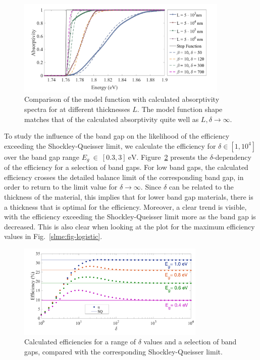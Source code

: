 \begin{refsection}
\begin{figure}[ht] 
\centering 
\captionsetup{width=0.9\textwidth}
\includegraphics[width=0.9\textwidth]{Figures/slme/sq_Fig2.png} 
\caption{Comparison of the model function with calculated absorptivity spectra 
for  at different thicknesses $L$. The model function shape 
matches that of the calculated absorptivity quite well as $L,\delta 
\rightarrow \infty$.} 
\label{slme:fig-step} 
\end{figure} 
 
To study the influence of the band gap on the likelihood of the efficiency 
exceeding the Shockley-Queisser limit, we calculate the efficiency for $\delta 
\in [1, 10^4]$ over the band gap range $E_g~\in~[0.3, 3]~\si{\electronvolt}$. 
Figure~\ref{slme:fig-deltadep} presents the $\delta$-dependency of the efficiency for a selection of band gaps. For low band gaps, the 
calculated efficiency crosses the detailed balance limit of the corresponding 
band gap, in order to return to the limit value for $\delta \rightarrow 
\infty$. Since $\delta$ can be related to the thickness of the material, this 
implies that for lower band gap materials, there is a thickness that is 
optimal for the efficiency. Moreover, a clear trend is visible, with the 
efficiency exceeding the Shockley-Queisser limit more as the band gap is 
decreased. This is also clear when looking at the plot for the 
maximum efficiency values in Fig.~\ref{slme:fig-logistic}. 
 
\begin{figure}[ht] 
\centering 
\captionsetup{width=0.9\textwidth}
\includegraphics[width=0.8\textwidth]{Figures/slme/sq_Fig3.png} 
\caption{Calculated efficiencies for a range of $\delta$ values and a 
selection of band gaps, compared with the corresponding Shockley-Queisser 
limit.} 
\label{slme:fig-deltadep} 
\end{figure} 
 

\end{refsection}

